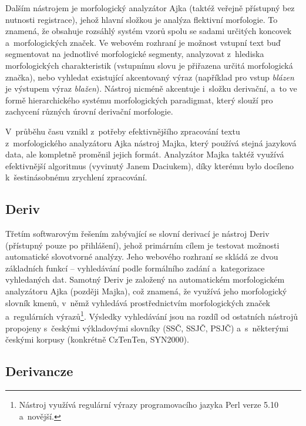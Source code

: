 Dalším nástrojem je morfologický analyzátor Ajka (taktéž veřejně
přístupný bez nutnosti registrace), jehož hlavní složkou je analýza
flektivní morfologie. To znamená, že obsahuje rozsáhlý systém vzorů
spolu se sadami určitých koncovek a~morfologických značek. Ve webovém
rozhraní je možnost vstupní text buď segmentovat na jednotlivé
morfologické segmenty, analyzovat z~hlediska morfologických
charakteristik (vstupnímu slovu je přiřazena určitá morfologická
značka), nebo vyhledat existující akcentovaný výraz (například pro vstup
\emph{blázen} je výstupem výraz \emph{blažen}). Nástroj nicméně
akcentuje i~složku derivační, a~to ve formě hierarchického systému
morfologických paradigmat, který slouží pro zachycení různých úrovní
derivační morfologie.~\parencite{ajka}

V~průběhu času vznikl z~potřeby efektivnějšího zpracování textu
z~morfologického analyzátoru Ajka nástroj Majka, který používá stejná
jazyková data, ale kompletně proměnil jejich formát. Analyzátor Majka
taktéž využívá efektivnější algoritmus (vyvinutý Janem Daciukem), díky
kterému bylo docíleno k~šestinásobnému zrychlení zpracování.
\parencite{majka}

\hypertarget{deriv}{%
\subsection{Deriv}\label{deriv}}

Třetím softwarovým řešením zabývající se slovní derivací je nástroj
Deriv (přístupný pouze po přihlášení), jehož primárním cílem je testovat
možnosti automatické slovotvorné analýzy. Jeho webového rozhraní se
skládá ze dvou základních funkcí -- vyhledávání podle formálního zadání
a~kategorizace vyhledaných dat. Samotný Deriv je založený na
automatickém morfologickém analyzátoru Ajka (později Majka), což
znamená, že využívá jeho morfologický slovník kmenů, v~němž vyhledává
prostřednictvím morfologických značek a~regulárních
výrazů\footnote{Nástroj využívá regulární výrazy programovacího jazyka Perl verze 5.10 a~novější.}.
Výsledky vyhledávání jsou na rozdíl od ostatních nástrojů propojeny
s~českými výkladovými slovníky (SSČ, SSJČ, PSJČ) a~s~některými českými
korpusy (konkrétně CzTenTen, SYN2000).~\parencite{deriv}

\hypertarget{derivancze}{%
\subsection{Derivancze}\label{derivancze}}

